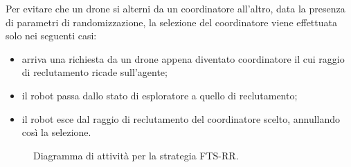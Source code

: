 Per evitare che un drone si alterni da un coordinatore all'altro, data la presenza di parametri di randomizzazione, la selezione del coordinatore viene effettuata solo nei seguenti casi:
\begin{itemize}
    \item arriva una richiesta da un drone appena diventato coordinatore il cui raggio di reclutamento ricade sull'agente;
    \item il robot passa dallo stato di esploratore a quello di reclutamento;
    \item il robot esce dal raggio di reclutamento del coordinatore scelto, annullando così la selezione.
\end{itemize}

\begin{figure}[H] 
    \captionsetup{justification=centering, margin=2cm, font=footnotesize}
    \begin{center}
    \end{center}
    \caption{Diagramma di attività per la strategia FTS-RR.}
    \label{attivita_fts}
\end{figure}

